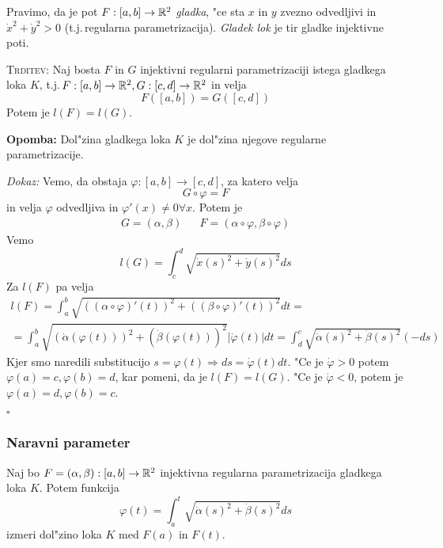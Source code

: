  Pravimo, da je pot $F: [a, b] \to \mathbb{R}^2$ \emph{gladka}, "ce sta $x$ in $y$ zvezno odvedljivi in $\dot{x}^2 + \dot{y}^2 > 0$ (t.j.\,regularna parametrizacija). \emph{Gladek lok} je tir gladke injektivne poti.

\textsc{Trditev:} Naj bosta $F$ in $G$ injektivni regularni parametrizaciji istega gladkega loka $K$, t.j.\,$F:[a,b] \to \mathbb{R}^2, G: [c, d] \to \mathbb{R}^2$ in velja
\begin{equation*}
F([a, b]) = G([c, d])
\end{equation*}
Potem je $l(F) = l(G)$.

\textbf{Opomba:} Dol"zina gladkega loka $K$ je dol"zina njegove regularne parametrizacije.

\emph{Dokaz:} Vemo, da obstaja $\varphi: [a, b] \to [c, d]$, za katero velja
\begin{equation*}
G \circ \varphi = F
\end{equation*}
in velja $\varphi$ odvedljiva in $\varphi'(x) \neq 0 \forall x$. Potem je
\begin{align*}
G = (\alpha, \beta) && F = (\alpha \circ \varphi, \beta \circ \varphi)
\end{align*}
Vemo
\begin{equation*}
l(G) = \int_c^d \sqrt{\dot{x}(s)^2 + \dot{y}(s)^2} ds
\end{equation*}
Za $l(F)$ pa velja
\begin{multline*}
l(F) = \int_a^b \sqrt{((\alpha \circ \varphi)' (t))^2 + ((\beta \circ \varphi)'(t))^2} dt = \\
= \int_a^b \sqrt{(\dot{\alpha}(\varphi(t)))^2 + (\dot{\beta}(\varphi(t)))^2} |\dot{\varphi}(t)| dt = \int_d^c \sqrt{\dot{\alpha}(s)^2 + \dot{\beta}(s)^2} (-ds)
\end{multline*}
Kjer smo naredili substitucijo $s = \varphi(t) \Rightarrow ds = \dot{\varphi}(t) dt$. "Ce je $\dot{\varphi} > 0$ potem $\varphi(a) = c, \varphi(b) = d$, kar pomeni, da je $l(F) = l(G)$. "Ce je $\dot{\varphi} < 0$, potem je $\varphi(a) = d, \varphi(b) = c$.

\hfill $\square$

\subsubsection{Naravni parameter}
Naj bo $F = (\alpha, \beta): [a, b] \to \mathbb{R}^2$ injektivna regularna parametrizacija gladkega loka $K$. Potem funkcija
\begin{equation*}
\varphi(t) = \int_a^t \sqrt{\dot{\alpha}(s)^2 + \dot{\beta}(s)^2} ds
\end{equation*}
izmeri dol"zino loka $K$ med $F(a)$ in $F(t)$.

